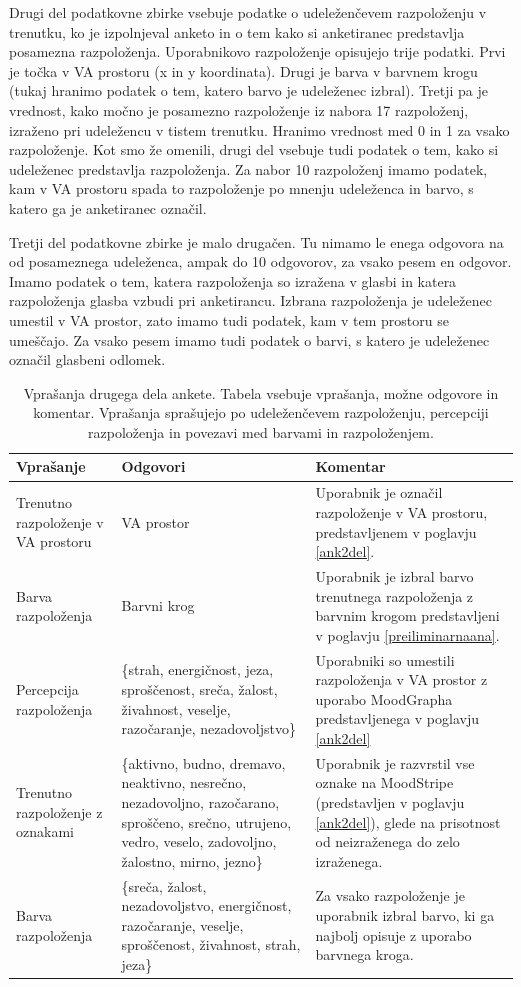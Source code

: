 \documentclass[a4paper, 12pt]{book}
\begin{document}
{Drugi del podatkovne zbirke vsebuje podatke o udeleženčevem razpoloženju v trenutku, ko je izpolnjeval anketo in o tem kako si anketiranec predstavlja posamezna razpoloženja. Uporabnikovo razpoloženje opisujejo trije podatki. Prvi je točka v VA prostoru (x in y koordinata). Drugi je barva v barvnem krogu (tukaj hranimo podatek o tem, katero barvo je  udeleženec izbral). Tretji pa je vrednost, kako močno je posamezno razpoloženje iz nabora 17 razpoloženj, izraženo pri udeležencu v tistem trenutku. Hranimo vrednost med 0 in 1 za vsako razpoloženje. Kot smo že omenili, drugi del vsebuje tudi podatek o tem, kako si udeleženec predstavlja razpoloženja. Za nabor 10 razpoloženj imamo podatek, kam v VA prostoru spada to razpoloženje po mnenju udeleženca in barvo, s katero ga je anketiranec označil. 

Tretji del podatkovne zbirke je malo drugačen. Tu nimamo le enega odgovora na od posameznega udeleženca, ampak do 10 odgovorov, za vsako pesem en odgovor. Imamo podatek o tem, katera razpoloženja so izražena v glasbi in katera razpoloženja glasba vzbudi pri anketirancu. Izbrana razpoloženja je udeleženec umestil v VA prostor, zato imamo tudi podatek, kam v tem prostoru se umeščajo.  Za vsako pesem imamo tudi podatek o barvi, s katero je udeleženec označil glasbeni odlomek.  

\begin{table}[H]
\begin{center}
\caption{Vprašanja drugega dela ankete. Tabela vsebuje vprašanja, možne odgovore in komentar. Vprašanja sprašujejo po udeleženčevem razpoloženju, percepciji razpoloženja in povezavi med barvami in razpoloženjem.}
\begin{tabular}{| p{3.5cm} | p{4.5cm} | p{4.5cm} |}
\hline
Vprašanje & Odgovori & Komentar \\ \hline \hline
Trenutno razpoloženje v VA prostoru & VA prostor & Uporabnik je označil razpoloženje v VA prostoru, predstavljenem v poglavju \ref{ank2del}. \\ \hline
Barva razpoloženja & Barvni krog & Uporabnik je izbral barvo trenutnega razpoloženja z barvnim krogom predstavljeni v poglavju \ref{preiliminarnaana}. \\ \hline
Percepcija razpoloženja & \{strah, energičnost, jeza, sproščenost, sreča, žalost, živahnost, veselje, razočaranje, nezadovoljstvo\} & Uporabniki so umestili razpoloženja v VA prostor z uporabo MoodGrapha predstavljenega v poglavju \ref{ank2del} \\ \hline
Trenutno razpoloženje z oznakami & \{aktivno, budno, dremavo, neaktivno, nesrečno, nezadovoljno, razočarano, sproščeno, srečno, utrujeno, vedro, veselo, zadovoljno, žalostno, mirno, jezno\} & Uporabnik je razvrstil vse oznake na MoodStripe (predstavljen v poglavju \ref{ank2del}), glede na prisotnost od neizraženega do zelo izraženega. \\ \hline
Barva razpoloženja & \{sreča, žalost, nezadovoljstvo, energičnost, razočaranje, veselje, sproščenost, živahnost, strah, jeza\} & Za vsako razpoloženje je uporabnik izbral barvo, ki ga najbolj opisuje z uporabo barvnega kroga. \\ \hline


\end{tabular}
\end{center}
\end{table}}
\end{document}
